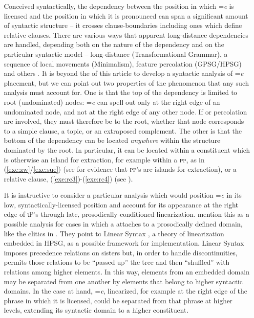 \documentclass[output=paper,
modfonts
]{LSP/langsci}
\begin{document}
Conceived syntactically, the dependency between the position in which =\emph{e} is licensed and the position in 
which it is pronounced can span a significant amount of syntactic structure  --  it crosses clause-boundaries including ones
which define relative clauses. There are various ways that apparent long-distance dependencies are handled, depending
both on the nature of the dependency and on the particular syntactic model  -- 
long-distance  (Transformational Grammar), a sequence of local movements (Minimalism), 
feature percolation (GPSG/HPSG) and others \citep{alexiadou2012a}. 
It is beyond the  of this article to develop a syntactic analysis of =\emph{e} placement, but we can point out
two properties of the phenomenon that any such analysis must account for. 
One is that the top of the dependency is limited to root (undominated)
nodes: =\emph{e} can spell out only at the right edge of an undominated node, and not at the right edge of any other node. 
If  or percolation are involved, they must therefore be to the root, whether that node corresponds to a simple clause,
a topic, or an extraposed complement. The other is that the bottom of the dependency can be located \emph{anywhere} 
within the structure dominated by the root. In particular, it can  be located within a constituent which is otherwise an island for extraction,
for example within a \textsc{pp}, as in (\ref{exe:zw}/\ref{exe:sue}) (see \citealt{aissen1996} for evidence that \textsc{pp}'s 
are islands for extraction), or a relative clause, (\ref{exe:rc3})\--(\ref{exe:rc4}) (see \citealt{aissen1992}). 

It is instructive to consider a particular analysis which would position =\emph{e} in its low, syntactically-licensed position 
and account  for its appearance at the right edge of ιP's through late, prosodically-conditioned linearization.
  \citet{otero2011} mention this as a possible analysis for cases in which a  attaches to a 
 prosodically defined domain, like the  clitics in  \citep{chung2003}. 
 They point to Linear Syntax \citep{kathol2004}, a theory of linearization embedded in
HPSG, as a possible framework for implementation. Linear Syntax imposes precedence relations on sisters but, in order to handle 
discontinuities, permits those relations to be ``passed up'' the tree and then ``shuffled'' with relations among higher elements. In this way, 
elements from an embedded domain may be separated from one another by elements that belong to higher syntactic domains.
In the case at hand, =\emph{e}, linearized, for example at the right edge of
the phrase in which it is licensed, could be separated from that phrase at higher levels, extending its syntactic domain to a higher 
constituent. 
\end{document}
